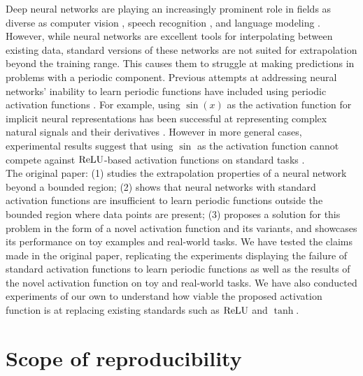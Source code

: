 Deep neural networks are playing an increasingly prominent role in fields as diverse as computer vision \cite{10.1007/978-3-030-11024-6_1}, speech recognition \cite{deng_2016}, and language modeling \cite{melis2017state}. However, while neural networks are excellent tools for interpolating between existing data, standard versions of these networks are not suited for extrapolation beyond the training range. This causes them to struggle at making predictions in problems with a periodic component. Previous attempts at addressing neural networks' inability to learn periodic functions have included using periodic activation functions \cite{fourier_one, zhumekenov2019fourier}. For example, using $\sin(x)$ as the activation function for implicit neural representations has been successful at representing complex natural signals and their derivatives \cite{sitzmann2020implicit}. However in more general cases, experimental results suggest that using $\sin$ as the activation function cannot compete against $ \operatorname{ReLU} $-based activation functions \cite{Ramachandran2017SwishAS, DBLP:conf/icml/NairH10, clevert2016fast, xu2015empirical} on standard tasks \cite{Parascandolo2017TamingTW}. \\

The original paper: (1) studies the extrapolation properties of a neural network beyond a bounded region; (2) shows that neural networks with standard activation functions are insufficient to learn periodic functions outside the bounded region where data points are present; (3) proposes a solution for this problem in the form of a novel activation function and its variants, and showcases its performance on toy examples and real-world tasks. We have tested the claims made in the original paper, replicating the experiments displaying the failure of standard activation functions to learn periodic functions as well as the results of the novel activation function on toy and real-world tasks. We have also conducted experiments of our own to understand how viable the proposed activation function is at replacing existing standards such as $\operatorname{ReLU}$ and $\tanh$.

\section{Scope of reproducibility}

